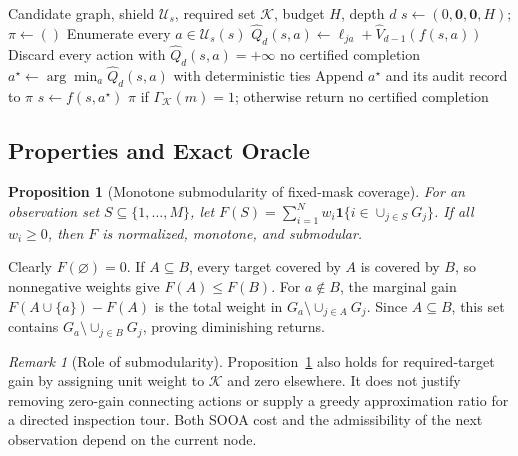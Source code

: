 \documentclass{IEEEtaes}
\newtheorem{proposition}{Proposition}
\theoremstyle{remark}
\newtheorem{remark}{Remark}
\theoremstyle{plain}
\begin{document}
\begin{algorithm}[t]
\caption{Viability-preserving rollout ADP}
\label{alg:safe-graph-api}
\begin{algorithmic}[1]
\Require Candidate graph, shield $\mathcal U_s$, required set $\mathcal K$, budget $H$, depth $d$
\State $s\gets(0,\mathbf0,\mathbf0,H)$; $\pi\gets()$
  \State Enumerate every $a\in\mathcal U_s(s)$
    \State $\widehat Q_d(s,a)\gets\ell_{ja}+\widehat V_{d-1}(f(s,a))$
  \EndFor
  \State Discard every action with $\widehat Q_d(s,a)=+\infty$
   \State \Return no certified completion \EndIf
  \State $a^\star\gets\arg\min_a \widehat Q_d(s,a)$ with deterministic ties
  \State Append $a^\star$ and its audit record to $\pi$
  \State $s\gets f(s,a^\star)$
\EndWhile
\State \Return $\pi$ if $\Gamma_{\mathcal K}(m)=1$; otherwise return no certified completion
\end{algorithmic}
\end{algorithm}

\subsection{Properties and Exact Oracle}
\label{sec:theory}

\begin{proposition}[Monotone submodularity of fixed-mask coverage]
\label{prop:submodular-coverage}
For an observation set $S\subseteq\{1,\ldots,M\}$, let $F(S)=\sum_{i=1}^{N}w_i\mathbf1\{i\in\cup_{j\in S}G_j\}$. If all $w_i\ge0$, then $F$ is normalized, monotone, and submodular.
\end{proposition}

\begin{IEEEproof}
Clearly $F(\varnothing)=0$. If $A\subseteq B$, every target covered by $A$ is covered by $B$, so nonnegative weights give $F(A)\le F(B)$. For $a\notin B$, the marginal gain $F(A\cup\{a\})-F(A)$ is the total weight in $G_a\setminus\cup_{j\in A}G_j$. Since $A\subseteq B$, this set contains $G_a\setminus\cup_{j\in B}G_j$, proving diminishing returns.
\end{IEEEproof}

\begin{remark}[Role of submodularity]
Proposition~\ref{prop:submodular-coverage} also holds for required-target gain by assigning unit weight to $\mathcal K$ and zero elsewhere. It does not justify removing zero-gain connecting actions or supply a greedy approximation ratio for a directed inspection tour. Both SOOA cost and the admissibility of the next observation depend on the current node.
\end{remark}
\end{document}
